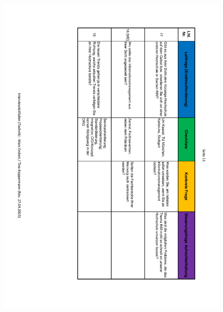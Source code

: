 \begin{figure}
	\centering
	\includegraphics[width=18cm]{kapitel/anhang/Interviewleitfaden_11}
\end{figure}